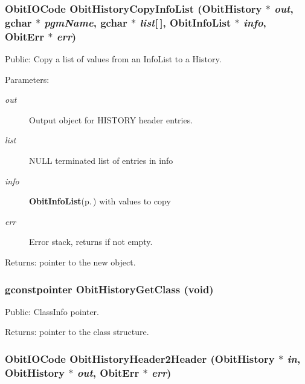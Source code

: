 \subsubsection{\setlength{\rightskip}{0pt plus 5cm}Obit\-IOCode Obit\-History\-Copy\-Info\-List ({\bf Obit\-History} $\ast$ {\em out}, gchar $\ast$ {\em pgm\-Name}, gchar $\ast$ {\em list}[$\,$], {\bf Obit\-Info\-List} $\ast$ {\em info}, {\bf Obit\-Err} $\ast$ {\em err})}\label{ObitHistory_8h_a22}


Public: Copy a list of values from an Info\-List to a History. 

\begin{Desc}
\item[Parameters:]
\begin{description}
\item[{\em out}]Output object for HISTORY header entries. \item[{\em list}]NULL terminated list of entries in info \item[{\em info}]{\bf Obit\-Info\-List}{\rm (p.\,\pageref{structObitInfoList})} with values to copy \item[{\em err}]Error stack, returns if not empty. \end{description}
\end{Desc}
\begin{Desc}
\item[Returns:]pointer to the new object. \end{Desc}
\subsubsection{\setlength{\rightskip}{0pt plus 5cm}gconstpointer Obit\-History\-Get\-Class (void)}\label{ObitHistory_8h_a10}


Public: Class\-Info pointer. 

\begin{Desc}
\item[Returns:]pointer to the class structure. \end{Desc}
\subsubsection{\setlength{\rightskip}{0pt plus 5cm}Obit\-IOCode Obit\-History\-Header2Header ({\bf Obit\-History} $\ast$ {\em in}, {\bf Obit\-History} $\ast$ {\em out}, {\bf Obit\-Err} $\ast$ {\em err})}\label{ObitHistory_8h_a16}


